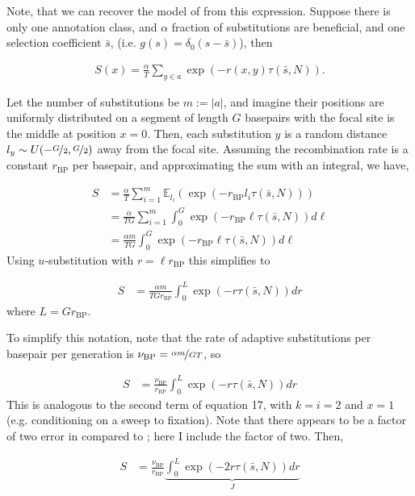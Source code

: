 \documentclass[9pt,lineno]{elife}
\newcommand{\E}{\mathbb{E}}
\begin{document}
\begin{appendixbox}
Note, that we can recover the model of \cite{Coop2012-cd} from this
expression. Suppose there is only one annotation class, and $\alpha$ fraction
of substitutions are beneficial, and one selection coefficient $\bar{s}$, (i.e.
$g(s) = \delta_0(s - \bar{s})$), then

\begin{align}
  S(x) = \frac{\alpha}{T} \sum_{y \in {a}} \exp(-r(x,y)\tau(\bar{s}, N)).
\end{align}
%

Let the number of substitutions be $m := |a|$, and imagine their positions are
uniformly distributed on a segment of length $G$ basepairs with the focal site
is the middle at position $x=0$. Then, each substitution $y$ is a random
distance $l_y \sim U(-\nicefrac{G}{2}, \nicefrac{G}{2})$ away from the focal
site. Assuming the recombination rate is a constant $r_\text{BP}$ per
basepair, and approximating the sum with an integral, we have,

\begin{align}
  S &= \frac{\alpha}{T} \sum_{i=1}^m \E_{l_i} \left(\exp(-r_\text{BP} l_i \tau(\bar{s}, N)) \right) \\
    &= \frac{\alpha}{T G} \sum_{i=1}^m \int_0^{G} \exp(-r_\text{BP} \ell \tau(\bar{s}, N)) d\ell \\
    &= \frac{\alpha m}{T G} \int_0^{G} \exp(-r_\text{BP} \ell \tau(\bar{s}, N)) d\ell
\end{align}
%
Using $u$-substitution with $r = \ell r_\text{BP}$ this simplifies to

\begin{align}
  S &= \frac{\alpha m}{T G r_\text{BP}} \int_0^{L} \exp(-r \tau(\bar{s}, N)) dr
\end{align}
%
where $L = G r_\text{BP}$. 

To simplify this notation, note that the rate of adaptive substitutions per
basepair per generation is $\nu_\text{BP} = \nicefrac{\alpha m}{GT}$, so 

\begin{align}
  S &= \frac{\nu_\text{BP}}{r_\text{BP}} \int_0^{L} \exp(-r \tau(\bar{s}, N)) dr
\end{align}
%
This is analogous to the second term of \cite{Coop2012-cd} equation 17,
with $k = i = 2$ and $x = 1$ (e.g.  conditioning on a sweep to fixation). Note
that there appears to be a factor of two error in \cite{Elyashiv2016-vt}
compared to \cite{Coop2012-cd}; here I include the factor of two.  Then,

\begin{align}
  S &= \frac{\nu_\text{BP}}{r_\text{BP}} \underbrace{\int_0^{L} \exp(-2r \tau(\bar{s}, N)) dr}_{J}
\end{align}
%


\end{appendixbox}
\end{document}
